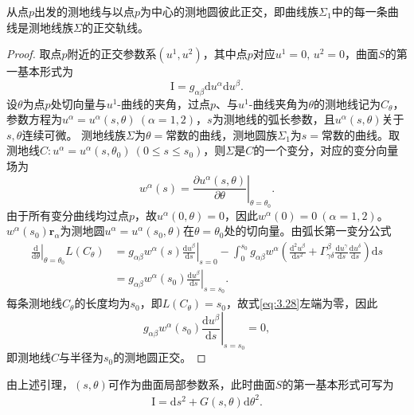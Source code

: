 \documentclass[../../main.tex]{subfiles}%
\begin{document}
\begin{lemma}
从点$p$出发的测地线与以点$p$为中心的测地圆彼此正交，即曲线族$\Sigma_1$中的每一条曲线是测地线族$\Sigma$的正交轨线。
\end{lemma}

\begin{proof}

取点$p$附近的正交参数系$(u^1,u^2)$，其中点$p$对应$u^1=0,\,u^2=0$，曲面$S$的第一基本形式为
$$\mathrm{I}=g_{\alpha\beta}\mathrm{d}u^\alpha\mathrm{d}u^\beta.$$
设$\theta$为点$p$处切向量与$u^1$-曲线的夹角，过点$p$、与$u^1$-曲线夹角为$\theta$的测地线记为$C_\theta$，参数方程为$u^\alpha=u^\alpha(s,\theta)\ (\alpha=1,2)$，$s$为测地线的弧长参数，且$u^\alpha(s,\theta)$关于$s,\theta$连续可微。
测地线族$\Sigma$为$\theta=\text{常数}$的曲线，测地圆族$\Sigma_1$为$s=\text{常数}$的曲线。取测地线$C:u^\alpha=u^\alpha(s,\theta_0)\ (0\leqslant s\leqslant s_0)$，则$\Sigma$是$C$的一个变分，对应的变分向量场为
$$w^\alpha(s)=\left.\frac{\partial u^\alpha(s,\theta)}{\partial\theta}\right|_{\theta=\theta_0}.$$
由于所有变分曲线均过点$p$，故$u^\alpha(0,\theta)=0$，因此$w^\alpha(0)=0\ (\alpha=1,2)$。
$w^\alpha(s_0)\boldsymbol{r}_\alpha$为测地圆$u^\alpha=u^\alpha(s_0,\theta)$在$\theta=\theta_0$处的切向量。由弧长第一变分公式
\begin{align}
\left.\frac{\mathrm{d}}{\mathrm{d}\theta}\right|_{\theta=\theta_0}L(C_\theta)&=g_{\alpha\beta}w^\alpha(s)\left.\frac{\mathrm{d}u^\beta}{\mathrm{d}s}\right|_{s=0}-\int_{0}^{s_0}g_{\alpha\beta}w^\alpha\left(\frac{\mathrm{d}^2u^\beta}{\mathrm{d}s^2}+\Gamma^\beta_{\gamma\delta}\frac{\mathrm{d}u^\gamma}{\mathrm{d}s}\frac{\mathrm{d}u^\delta}{\mathrm{d}s}\right)\mathrm{d}s\nonumber\\
&=g_{\alpha\beta}w^\alpha(s_0)\left.\frac{\mathrm{d}u^\beta}{\mathrm{d}s}\right|_{s=s_0}.
\label{eq:3.28}
\end{align}
每条测地线$C_\theta$的长度均为$s_0$，即$L(C_\theta)=s_0$，故式\eqref{eq:3.28}左端为零，因此
$$g_{\alpha\beta}w^\alpha(s_0)\left.\frac{\mathrm{d}u^\beta}{\mathrm{d}s}\right|_{s=s_0}=0,$$
即测地线$C$与半径为$s_0$的测地圆正交。

\end{proof}

由上述引理，$(s,\theta)$可作为曲面局部参数系，此时曲面$S$的第一基本形式可写为
\begin{align}
\mathrm{I}=\mathrm{d}s^2+G(s,\theta)\mathrm{d}\theta^2.
\label{eq:3.29}
\end{align}
\end{document}
